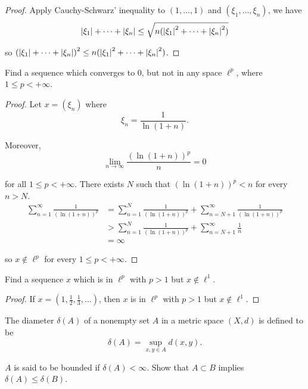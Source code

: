 \begin{proof}
    Apply Cauchy-Schwarz' inequality to $(1, \ldots, 1)$ and $(\xi_{1}, \ldots, \xi_{n})$, we have
    \[
        \left\vert{\xi_{1}}\right\vert + \cdots + \left\vert{\xi_{n}}\right\vert \leq \sqrt{n(\left\vert{\xi_{1}}\right\vert^{2} + \cdots + \left\vert{\xi_{n}}\right\vert^{2})}
    \]

    so ${(\left\vert{\xi_{1}}\right\vert + \cdots + \left\vert{\xi_{n}}\right\vert)}^{2} \leq n(\left\vert{\xi_{1}}\right\vert^{2} + \cdots + \left\vert{\xi_{n}}\right\vert^{2})$.
\end{proof}

\begin{exercise}\label{chapter1:section2:exercise4}
    Find a sequence which converges to $0$, but not in any space $\ell^{p}$, where $1\leq p < +\infty$.
\end{exercise}

\begin{proof}
    Let $x = (\xi_{n})$ where
    \[
        \xi_{n} = \frac{1}{\ln (1 + n)}.
    \]

    Moreover,
    \[
        \lim\limits_{n\to\infty}\frac{{(\ln (1 + n))}^{p}}{n} = 0
    \]

    for all $1\leq p < +\infty$. There exists $N$ such that ${(\ln(1+n))}^{p} < n$ for every $n > N$.
    \begin{align*}
        \sum^{\infty}_{n=1}\frac{1}{{(\ln(1+n))}^{p}} & = \sum^{N}_{n=1}\frac{1}{{(\ln(1+n))}^{p}} + \sum^{\infty}_{n=N+1}\frac{1}{{(\ln(1+n))}^{p}} \\
                                                      & > \sum^{N}_{n=1}\frac{1}{{(\ln(1+n))}^{p}} + \sum^{\infty}_{n=N+1}\frac{1}{n}                \\
                                                      & = \infty
    \end{align*}

    so $x\notin \ell^{p}$ for every $1\leq p < +\infty$.
\end{proof}

\begin{exercise}\label{chapter1:section2:exercise5}
    Find a sequence $x$ which is in $\ell^{p}$ with $p > 1$ but $x\notin\ell^{1}$.
\end{exercise}

\begin{proof}
    If $x = \left(1, \frac{1}{2}, \frac{1}{3}, \ldots\right)$, then $x$ is in $\ell^{p}$ with $p > 1$ but $x\notin\ell^{1}$.
\end{proof}

\begin{exercise}\label{chapter1:section2:exercise6}
    The diameter $\delta(A)$ of a nonempty set $A$ in a metric space $(X, d)$ is defined to be
    \[
        \delta(A) = \sup\limits_{x,y\in A} d(x, y).
    \]

    $A$ is said to be bounded if $\delta(A) < \infty$. Show that $A\subset B$ implies $\delta(A) \leq \delta(B)$.
\end{exercise}

